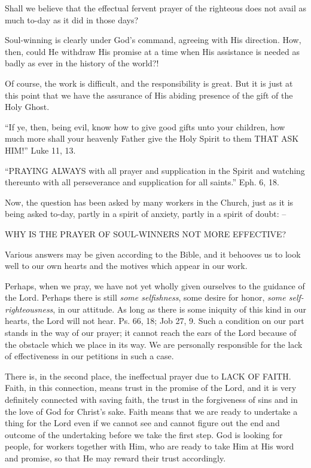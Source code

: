 \documentclass[
]{book}
\begin{document}
Shall we believe that the effectual fervent prayer of the righteous does not avail as much to-day as it did in those days?

Soul-winning is clearly under God's command, agreeing with His direction. How, then, could He withdraw His promise at a time when His assistance is needed as badly as ever in the history of the world?!

Of course, the work is difficult, and the responsibility is great. But it is just at this point that we have the assurance of His abiding presence of the gift of the Holy Ghost.

``If ye, then, being evil, know how to give good gifts unto your children, how much more shall your heavenly Father give the Holy Spirit to them THAT ASK HIM!'' Luke 11, 13.

``PRAYING ALWAYS with all prayer and supplication in the Spirit and watching thereunto with all perseverance and supplication for all saints.'' Eph. 6, 18.

Now, the question has been asked by many workers in the Church, just as it is being asked to-day, partly in a spirit of anxiety, partly in a spirit of doubt: --

WHY IS THE PRAYER OF SOUL-WINNERS NOT MORE EFFECTIVE?

Various answers may be given according to the Bible, and it behooves us to look well to our own hearts and the motives which appear in our work.

Perhaps, when we pray, we have not yet wholly given ourselves to the guidance of the Lord. Perhaps there is still \emph{some selfishness}, some desire for honor, \emph{some self-righteousness}, in our attitude. As long as there is some iniquity of this kind in our hearts, the Lord will not hear. Ps. 66, 18; Job 27, 9. Such a condition on our part stands in the way of our prayer; it cannot reach the ears of the Lord because of the obstacle which we place in its way. We are personally responsible for the lack of effectiveness in our petitions in such a case.

There is, in the second place, the ineffectual prayer due to LACK OF FAITH. Faith, in this connection, means trust in the promise of the Lord, and it is very definitely connected with saving faith, the trust in the forgiveness of sins and in the love of God for Christ's sake. Faith means that we are ready to undertake a thing for the Lord even if we cannot see and cannot figure out the end and outcome of the undertaking before we take the first step. God is looking for people, for workers together with Him, who are ready to take Him at His word and promise, so that He may reward their trust accordingly.
\end{document}
